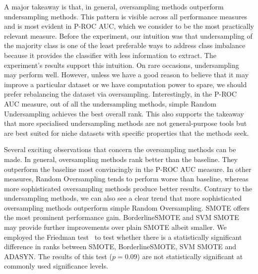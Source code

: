 \documentclass[conference]{IEEEtran}
\begin{document}
A major takeaway is that, in general, oversampling methods outperform undersampling methods. This
pattern is visible across all performance measures and is most evident in P-ROC AUC, which we
consider to be the most practically relevant measure. Before the experiment, our intuition was that
undersampling of the majority class is one of the least preferable ways to address class imbalance
because it provides the classifier with less information to extract. The experiment's results
support this intuition. On rare occasions, undersampling may perform well. However, unless we have
a good reason to believe that it may improve a particular dataset or we have computation power to
spare, we should prefer rebalancing the dataset via oversampling. Interestingly, in the P-ROC AUC
measure, out of all the undersampling methods, simple Random Undersampling achieves the best
overall rank. This also supports the takeaway that more specialised undersampling methods are not
general-purpose tools but are best suited for niche datasets with specific properties that the
methods seek.

Several exciting observations that concern the oversampling methods can be made. In general,
oversampling methods rank better than the baseline. They outperform the baseline most convincingly
in the P-ROC AUC measure. In other measures, Random Oversampling tends to perform worse than
baseline, whereas more sophisticated oversampling methods produce better results. Contrary to the
undersampling methods, we can also see a clear trend that more sophisticated oversampling methods
outperform simple Random Oversampling. SMOTE offers the most prominent performance gain.
BorderlineSMOTE and SVM SMOTE may provide further improvements over plain SMOTE albeit smaller. We
employed the Friedman test~\cite{stats-comparison} to test whether there is a statistically
significant difference in ranks between SMOTE, BorderlineSMOTE, SVM SMOTE and ADASYN. The results
of this test ($p = 0.09$) are not statistically significant at commonly used significance levels.
\end{document}
